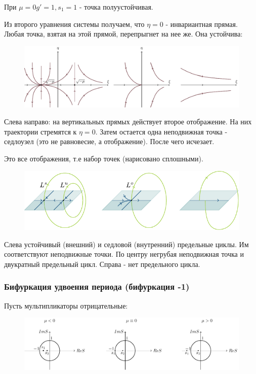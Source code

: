 При $\mu=0 g'=1, s_1=1$ - точка полуустойчивая. 

Из второго уравнения системы получаем, что $\eta=0$ - инвариантная прямая. Любая точка, взятая на этой прямой, перепрыгнет на нее же. Она устойчива:  
\begin{figure}[H]
	\centering
	\includegraphics[width=1\linewidth]{fig/fig65.pdf}   
\end{figure}

Слева направо: на вертикальных прямых действует второе отображение. На них траектории стремятся к $\eta=0$. Затем остается одна неподвижная точка - седлоузел (это не равновесие, а отображение). После чего исчезает.

Это все отображения, т.е набор точек (нарисовано сплошными).
\begin{figure}[H]
	\centering
	\includegraphics[width=1\linewidth]{fig/fig66.pdf}   
\end{figure}

Слева устойчивый (внешний) и седловой (внутренний) предельные циклы. Им соответствуют неподвижные точки. По центру негрубая неподвижная точка и двукратный предельный цикл. Справа - нет предельного цикла.

\subsubsection{Бифуркация удвоения периода (бифуркация -1)}
Пусть мультипликаторы отрицательные:
\begin{figure}[H]
	\centering
	\includegraphics[width=1\linewidth]{fig/fig67.pdf}   
\end{figure}

